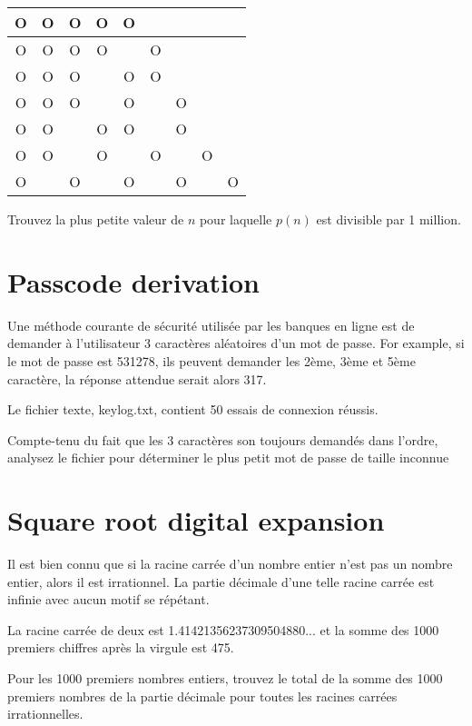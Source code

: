 \begin{center}
    \begin{tabular}{|ccccccccc|}
        \hline
        O & O & O & O & O & & & &\\
        \hline
        O & O & O & O & & O & & &\\
        \hline
        O & O & O & & O & O & & &\\
        \hline
        O & O & O & & O & & O & &\\
        \hline
        O & O & & O & O & & O & &\\
        \hline
        O & O & & O & & O & & O &\\
        \hline
        O & & O & & O & & O & & O\\
        \hline
    \end{tabular}
\end{center}

Trouvez la plus petite valeur de $n$ pour laquelle $p(n)$ est divisible par 1 million.

\section{Passcode derivation} \label{pb.079}

Une méthode courante de sécurité utilisée par les banques en ligne est de demander à l'utilisateur 3 caractères aléatoires d'un mot de passe. For example, si le mot de passe est 531278, ils peuvent demander les 2ème, 3ème et 5ème caractère, la réponse attendue serait alors 317.

Le fichier texte, keylog.txt, contient 50 essais de connexion réussis.

Compte-tenu du fait que les 3 caractères son toujours demandés dans l'ordre, analysez le fichier pour déterminer le plus petit mot de passe de taille inconnue

\section{Square root digital expansion} \label{pb.080}

Il est bien connu que si la racine carrée d'un nombre entier n'est pas un nombre entier, alors il est irrationnel. La partie décimale d'une telle racine carrée est infinie avec aucun motif se répétant.

La racine carrée de deux est 1.41421356237309504880... et la somme des 1000 premiers chiffres après la virgule est 475.

Pour les 1000 premiers nombres entiers, trouvez le total de la somme des 1000 premiers nombres de la partie décimale pour toutes les racines carrées irrationnelles.

